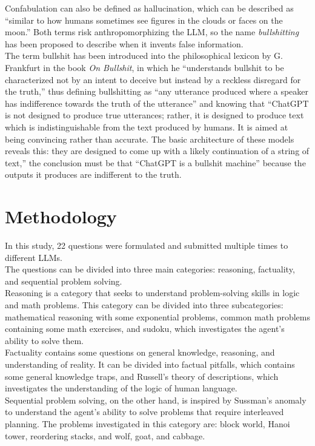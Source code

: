 \documentclass[12pt]{article}
\begin{document}
Confabulation can also be defined as hallucination, which can be described as “similar to how humans sometimes see figures in the clouds or faces on the moon.”\cite{IBMhallucinations} Both terms risk anthropomorphizing the LLM, so the name \textit{bullshitting} has been proposed to describe when it invents false information.\cite{bullshit}\\
The term bullshit has been introduced into the philosophical lexicon by G. Frankfurt in the book \textit{On Bullshit}, in which he “understands bullshit to be characterized not by an intent to deceive but instead by a reckless disregard for the truth,” thus defining bullshitting as “any utterance produced where a speaker has indifference towards the truth of the utterance” and knowing that “ChatGPT is not designed to produce true utterances; rather, it is designed to produce text which is indistinguishable from the text produced by humans. It is aimed at being convincing rather than accurate. The basic architecture of these models reveals this: they are designed to come up with a likely continuation of a string of text,” the conclusion must be that “ChatGPT is a bullshit machine” because the outputs it produces are indifferent to the truth.\cite{bullshit}
     
\clearpage
\section{Methodology}

    In this study, 22 questions were formulated and submitted multiple times to different LLMs.\\
The questions can be divided into three main categories: reasoning, factuality, and sequential problem solving.\\
Reasoning is a category that seeks to understand problem-solving skills in logic and math problems. This category can be divided into three subcategories: mathematical reasoning with some exponential problems, common math problems containing some math exercises, and sudoku, which investigates the agent's ability to solve them.\\
Factuality contains some questions on general knowledge, reasoning, and understanding of reality. It can be divided into factual pitfalls, which contains some general knowledge traps, and Russell's theory of descriptions, which investigates the understanding of the logic of human language.\\
Sequential problem solving, on the other hand, is inspired by Sussman's anomaly to understand the agent's ability to solve problems that require interleaved planning. The problems investigated in this category are: block world, Hanoi tower, reordering stacks, and wolf, goat, and cabbage.\\
\end{document}
